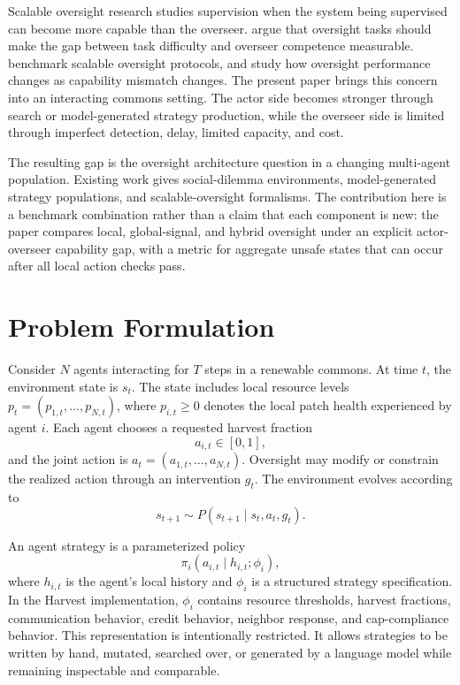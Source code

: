 \documentclass[11pt]{article}
\begin{document}
Scalable oversight research studies supervision when the system being supervised can become more capable than the overseer. \citet{bowman2022scalable} argue that oversight tasks should make the gap between task difficulty and overseer competence measurable. \citet{sudhir2025benchmark} benchmark scalable oversight protocols, and \citet{engels2025scaling} study how oversight performance changes as capability mismatch changes. The present paper brings this concern into an interacting commons setting. The actor side becomes stronger through search or model-generated strategy production, while the overseer side is limited through imperfect detection, delay, limited capacity, and cost.

The resulting gap is the oversight architecture question in a changing multi-agent population. Existing work gives social-dilemma environments, model-generated strategy populations, and scalable-oversight formalisms. The contribution here is a benchmark combination rather than a claim that each component is new: the paper compares local, global-signal, and hybrid oversight under an explicit actor-overseer capability gap, with a metric for aggregate unsafe states that can occur after all local action checks pass.

\section{Problem Formulation}

Consider $N$ agents interacting for $T$ steps in a renewable commons. At time $t$, the environment state is $s_t$. The state includes local resource levels $p_t=(p_{1,t},\ldots,p_{N,t})$, where $p_{i,t}\geq 0$ denotes the local patch health experienced by agent $i$. Each agent chooses a requested harvest fraction
\[
    a_{i,t} \in [0,1],
\]
and the joint action is $a_t=(a_{1,t},\ldots,a_{N,t})$. Oversight may modify or constrain the realized action through an intervention $g_t$. The environment evolves according to
\[
    s_{t+1} \sim P(s_{t+1}\mid s_t,a_t,g_t).
\]

An agent strategy is a parameterized policy
\[
    \pi_i(a_{i,t}\mid h_{i,t};\phi_i),
\]
where $h_{i,t}$ is the agent's local history and $\phi_i$ is a structured strategy specification. In the Harvest implementation, $\phi_i$ contains resource thresholds, harvest fractions, communication behavior, credit behavior, neighbor response, and cap-compliance behavior. This representation is intentionally restricted. It allows strategies to be written by hand, mutated, searched over, or generated by a language model while remaining inspectable and comparable.
\end{document}
